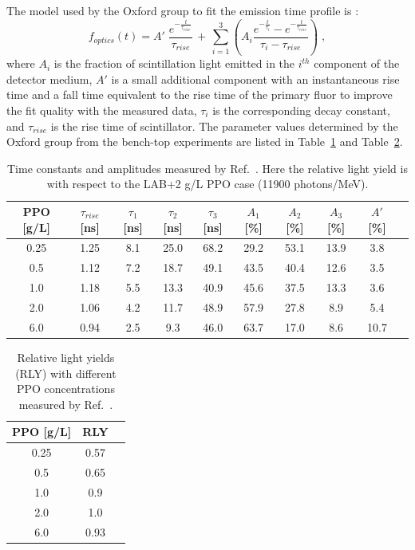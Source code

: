 The model used by the Oxford group to fit the emission time profile is \cite{oxfordMeasurement}: 
\begin{equation}
f_{optics}(t)= A' \; \frac{e^{-\frac{t}{\tau_{rise}}}}{\tau_{rise}} \, + \, \sum_{i=1}^3 (A_i\frac{e^{-\frac{t}{\tau_i}}-e^{-\frac{t}{\tau_{rise}}}}{\tau_i-\tau_{rise}}) \; ,
\end{equation}
where $A_i$ is the fraction of scintillation light emitted in the $i^{th}$ component of the detector medium, $A'$ is a small additional component with an instantaneous rise time and a
fall time equivalent to the rise time of the primary fluor to improve the fit quality with the measured data, $\tau_i$ is the corresponding decay constant, and $\tau_{rise}$ is the rise time of scintillator. The parameter values determined by the Oxford group from the bench-top experiments are listed in Table~\ref{tab:oxfordMeasure} and Table~\ref{tab:oxfordMeasure2}.

\begin{table}[ht]
	\centering
	\caption[Time constants and amplitudes measured by Oxford.]{\label{tab:oxfordMeasure} Time constants and amplitudes measured by Ref.~\cite{oxfordMeasurement}. Here the relative light yield is with respect to the LAB+2 g/L PPO case (11900 photons/MeV).}	
	{\centering
		\begin{tabular*}{160mm}{c@{\extracolsep{\fill}}ccccccccc}
			\toprule 
			PPO [g/L] & $\tau_{rise}$ [ns] & $\tau_1$ [ns] & $\tau_2$ [ns] & $\tau_3$ [ns] & $A_1$ [\%]  & $A_2$ [\%]   & $A_3$ [\%]  & $A'$ [\%] \\
			\midrule
			0.25 & 1.25 & 8.1 & 25.0 & 68.2 & 29.2 & 53.1 & 13.9 & 3.8\\
			0.5  & 1.12 & 7.2 & 18.7 & 49.1 & 43.5 & 40.4 & 12.6 & 3.5 \\
			1.0 & 1.18 & 5.5 & 13.3 & 40.9 & 45.6 & 37.5 & 13.3 & 3.6 \\
			2.0 & 1.06 & 4.2 & 11.7 & 48.9 & 57.9 & 27.8 & 8.9 & 5.4	\\
			6.0 & 0.94 & 2.5 & 9.3  & 46.0 & 63.7 & 17.0 & 8.6 & 10.7\\
			\bottomrule	
		\end{tabular*}
	}
\end{table}

\begin{table}[ht]
	\centering
	\caption[Relative light yields with different PPO concentrations.]{Relative light yields (RLY) with different PPO concentrations measured by Ref.~\cite{oxfordMeasurement}.\label{tab:oxfordMeasure2}}	
	{\centering
		\begin{tabular*}{60mm}{c@{\extracolsep{\fill}}cc}
			\toprule 
			PPO [g/L] & RLY \\
			\midrule
			0.25 & 0.57\\
			0.5 & 0.65\\
			1.0 & 0.9\\
			2.0 & 1.0\\
			6.0 & 0.93\\
			\bottomrule	
		\end{tabular*}
	}
\end{table}

